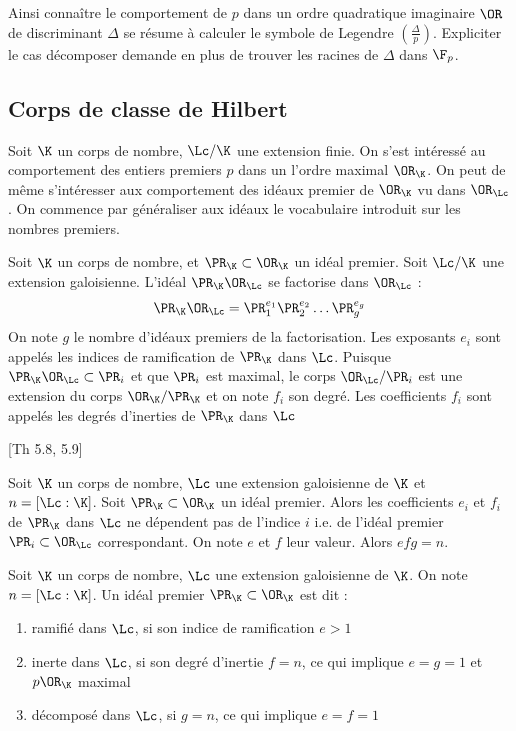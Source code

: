 Ainsi connaître le comportement de $p$ dans un ordre quadratique imaginaire $\OR$ de discriminant $\Delta$ se résume à calculer le symbole de Legendre $ \left( \frac{\Delta}{p}\right) $. Expliciter le cas décomposer demande en plus de trouver les racines de $\Delta$ dans $\F_{p}$. 

\subsection{Corps de classe de Hilbert}

Soit $\K$ un corps de nombre, $\Lc/\K$ une extension finie. On s'est intéressé au comportement des entiers premiers $p$ dans un l'ordre maximal $\OR_{\K}$. On peut de même s'intéresser aux comportement des idéaux premier de $\OR_{\K}$ vu dans $\OR_{\Lc}$. On commence par généraliser aux idéaux le vocabulaire introduit sur les nombres premiers.

\begin{Def}
	Soit $\K$ un corps de nombre, et $\PR_{\K}\subset\OR_{\K}$ un idéal premier. Soit $\Lc/\K$ une extension galoisienne. L'idéal $\PR_{\K}\OR_{\Lc}$ se factorise dans $\OR_{\Lc}$ :
	\begin{equation*}
		\PR_{\K}\OR_{\Lc} = \PR_{1}^{e_{1}}\PR_{2}^{e_{2}}\ldots\PR_{g}^{e_{g}}
	\end{equation*} 
	On note $g$ le nombre d'idéaux premiers de la factorisation. Les exposants $e_{i}$ sont appelés les indices de ramification de $\PR_{\K}$ dans $\Lc$.
	Puisque $\PR_{\K}\OR_{\Lc}\subset\PR_{i}$ et que $\PR_{i}$ est maximal, le corps $\OR_{\Lc}/\PR_{i}$ est une extension du corps $\OR_{\K}/\PR_{\K}$ et on note $f_{i}$ son degré. Les coefficients $f_{i}$ sont appelés les degrés d'inerties de $\PR_{\K}$ dans $\Lc$
\end{Def}


\begin{Prop}\cite{Cox}[Th 5.8, 5.9]
	
	Soit $\K$ un corps de nombre, $\Lc$ une extension galoisienne de $\K$ et $n = \left[ \Lc : \K\right] $. Soit $\PR_{\K}\subset\OR_{\K}$ un idéal premier. Alors les coefficients $e_{i}$ et $f_{i}$ de $\PR_{\K}$ dans $\Lc$ ne dépendent pas de l'indice $i$ i.e. de l'idéal premier $\PR_{i}\subset\OR_{\Lc}$ correspondant.  
	On note $e$ et $f$ leur valeur. Alors $efg = n$.
\end{Prop}

\begin{Def}
	Soit $\K$ un corps de nombre, $\Lc$ une extension galoisienne de $\K$. On note $n = \left[ \Lc : \K\right] $. Un idéal premier $\PR_{\K}\subset\OR_{\K}$ est dit :
	\begin{enumerate}
		\item ramifié dans $\Lc$, si son indice de ramification $e > 1$
		\item inerte dans $\Lc$, si son degré d'inertie $f = n$, ce qui implique $e = g = 1$ et $p\OR_{\K}$ maximal
		\item décomposé dans $\Lc$, si $g = n$, ce qui implique $e = f = 1$
	\end{enumerate}
\end{Def}

